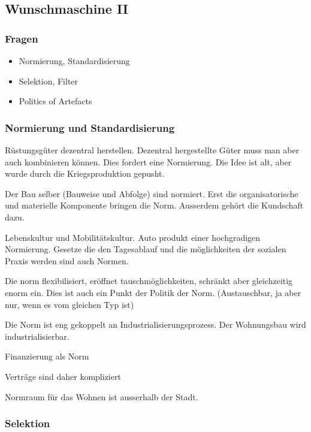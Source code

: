 \documentclass[a4paper,ngerman,11pt]{scrartcl}
\begin{document}
\subsection{Wunschmaschine II}
\label{sec-2-4}

\subsubsection{Fragen}
\label{sec-2-4-1}

\begin{itemize}
\item Normierung, Standardisierung
\item Selektion, Filter
\item Politics of Artefacts
\end{itemize}

\subsubsection{Normierung und Standardisierung}
\label{sec-2-4-2}

Rüstungsgüter dezentral herstellen. Dezentral hergestellte Güter muss man
aber auch kombinieren können. Dies fordert eine Normierung. Die Idee ist
alt, aber wurde durch die Kriegsproduktion gepusht.

Der Bau selber (Bauweise und Abfolge) sind normiert. Erst die
organisatorische und materielle Komponente bringen die Norm. Ausserdem
gehört die Kundschaft dazu.

Lebenskultur und Mobilitätskultur. Auto produkt einer hochgradigen
Normierung. Gesetze die den Tagesablauf und die möglichkeiten der sozialen
Praxis werden sind auch Normen.

Die norm flexibilisiert, eröffnet tauschmöglichkeiten, schränkt aber
gleichzeitig enorm ein. Dies ist auch ein Punkt der Politik der Norm.
(Austauschbar, ja aber nur, wenn es vom gleichen Typ ist)

Die Norm ist eng gekoppelt an Industrialisierungsprozess. Der Wohnungsbau
wird industrialisierbar.

Finanzierung als Norm

Verträge sind daher kompliziert

Normraum für das Wohnen ist ausserhalb der Stadt.

\subsubsection{Selektion}
\label{sec-2-4-3}
\end{document}
